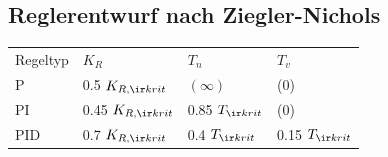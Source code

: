 \documentclass[german]{latex4ei/latex4ei_sheet}
\begin{document}
\begin{sectionbox}
	\subsection{Reglerentwurf nach Ziegler-Nichols}
	\begin{tabular}{llll}
		Regeltyp & $K_R$ & $T_n$ & $T_v$\\ \mrule
		P & 0.5 $K_{R, \ir krit}$ & $(\infty)$ & (0)\\
		PI & 0.45 $K_{R, \ir krit}$ & 0.85 $T_{\ir krit}$ & (0)\\
		PID & 0.7 $K_{R, \ir krit}$ & 0.4 $T_{\ir krit}$ & 0.15 $T_{\ir krit}$\\
	\end{tabular}
\end{sectionbox}
\end{document}
